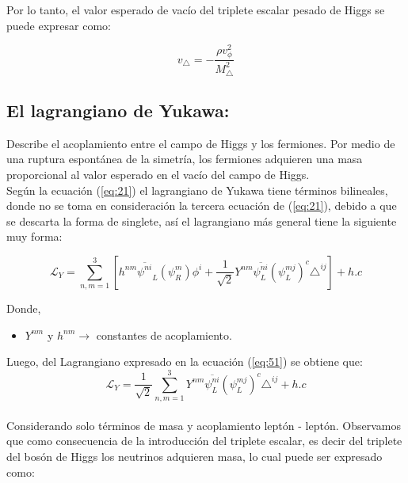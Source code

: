 \documentclass[12pt]{article}
\begin{document}
Por lo tanto, el valor esperado de vacío del triplete escalar pesado de Higgs se puede expresar como:

\begin{equation}
    \label{eq:valoresperadodevacío}
     v_\triangle = - \frac{\rho v^{2}_\phi}{M^{2}_\triangle}
\end{equation}


\subsection{El lagrangiano de Yukawa:} 

Describe el acoplamiento entre el campo de Higgs y los fermiones. Por medio de una ruptura espontánea de la simetría, los fermiones adquieren una masa proporcional al valor esperado en el vacío del campo de Higgs. \\

Según la ecuación (\ref{eq:21}) el lagrangiano de Yukawa tiene términos bilineales, donde no se toma en consideración la tercera ecuación de (\ref{eq:21}), debido a que se descarta la forma de singlete, así el lagrangiano más general tiene la siguiente muy forma: 

\begin{equation}
    \label{eq:51}
    \mathcal{L}_Y=  \sum_{n,m=1}^3 [ h^{nm} \overline{\psi^{ni}}_L ({\psi_R^{m}})\phi^i + \frac{1}{\sqrt{2}} Y^{nm} \overline{\psi_L^{ni}} ({\psi_L^{mj}})^{c} \triangle^{ij}] + h.c
\end{equation}

Donde, 

\begin{itemize}
    \item $Y^{nm}$ y $h^{nm} \rightarrow $ constantes de acoplamiento. 
\end{itemize}

  

Luego, del Lagrangiano expresado en la ecuación (\ref{eq:51}) se obtiene que: \\

\begin{equation}
    \mathcal{L}_Y= \frac{1}{\sqrt{2}} \sum_{n,m=1}^3 Y^{nm} \overline{\psi_L^{ni}} ({\psi_L^{mj}})^{c} \triangle^{ij} + h.c 
    \label{eq:17}
\end{equation}  \\

Considerando solo términos de masa y acoplamiento leptón - leptón.
Observamos que como consecuencia de la introducción del triplete escalar, es decir del triplete del bosón de Higgs los neutrinos adquieren masa, lo cual puede ser expresado como:\\
\end{document}
